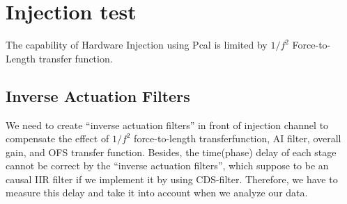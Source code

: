 \begin{center}
\end{center}
\begin{center}
\end{center}

\section{Injection test}
The capability of Hardware Injection using Pcal is limited by $1/f^2$ Force-to-Length transfer function.

\subsection{Inverse Actuation Filters}
We need to create “inverse actuation filters” in front of injection channel to compensate the effect of $1/f^2$ force-to-length transferfunction, AI filter, overall gain, and OFS transfer function\cite{ligo:inj}. Besides, the time(phase) delay of each stage cannot be correct by the “inverse actuation filters”, which suppose to be an causal IIR filter if we implement it by using CDS-filter. Therefore, we have to measure this delay and take it into account when we analyze our data.

